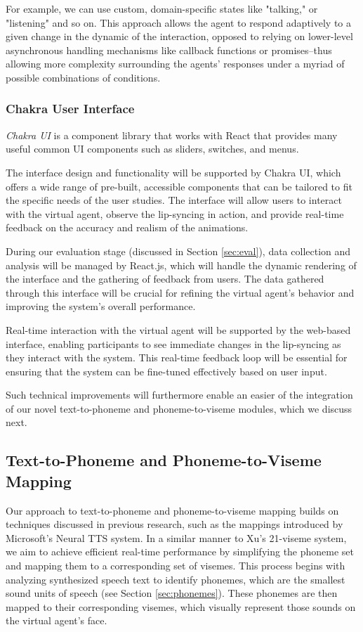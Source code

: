 \documentclass[12pt]{article}
\begin{document}
For example, we can use custom, domain-specific states like "talking," or "listening" and so on. This approach allows the agent to respond adaptively to a given change in the dynamic of the interaction, opposed to relying on lower-level asynchronous handling mechanisms like callback functions or promises--thus allowing more complexity surrounding the agents' responses under a myriad of possible combinations of conditions.

\subsubsection{Chakra User Interface}

{\em Chakra UI}  is a component library that works with React that provides many useful common UI components such as sliders, switches, and menus.

 The interface design and functionality will be supported by Chakra UI, which offers a wide range of pre-built, accessible components that can be tailored to fit the specific needs of the user studies. The interface will allow users to interact with the virtual agent, observe the lip-syncing in action, and provide real-time feedback on the accuracy and realism of the animations.

During our evaluation stage (discussed in Section \ref{sec:eval}), data collection and analysis will be managed by React.js, which will handle the dynamic rendering of the interface and the gathering of feedback from users. The data gathered through this interface will be crucial for refining the virtual agent’s behavior and improving the system’s overall performance. 

Real-time interaction with the virtual agent will be supported by the web-based interface, enabling participants to see immediate changes in the lip-syncing as they interact with the system. This real-time feedback loop will be essential for ensuring that the system can be fine-tuned effectively based on user input.

Such technical improvements will furthermore enable an easier of the integration of our novel text-to-phoneme and phoneme-to-viseme modules, which we discuss next.

\subsection{Text-to-Phoneme and Phoneme-to-Viseme Mapping}
Our approach to text-to-phoneme and phoneme-to-viseme mapping builds on techniques discussed in previous research, such as the mappings introduced by \cite{Xu2013AGames}  Microsoft’s Neural TTS system. In a similar manner to Xu’s 21-viseme system, we aim to achieve efficient real-time performance by simplifying the phoneme set and mapping them to a corresponding set of visemes. This process begins with analyzing synthesized speech text to identify phonemes, which are the smallest sound units of speech (see Section \ref{sec:phonemes}). These phonemes are then mapped to their corresponding visemes, which visually represent those sounds on the virtual agent's face.
\end{document}
